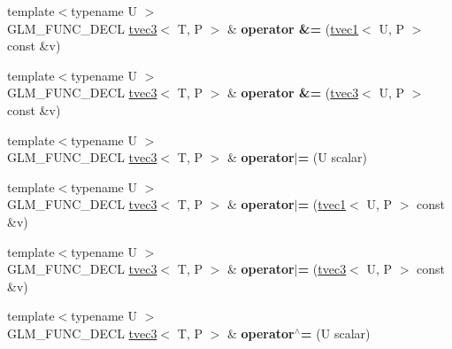 \begin{DoxyCompactItemize}
{\footnotesize template$<$typename U $>$ }\\G\+L\+M\+\_\+\+F\+U\+N\+C\+\_\+\+D\+E\+CL \hyperlink{structglm_1_1tvec3}{tvec3}$<$ T, P $>$ \& {\bfseries operator \&=} (\hyperlink{structglm_1_1tvec1}{tvec1}$<$ U, P $>$ const \&v)
\item 
\mbox{\label{structglm_1_1tvec3_a9a83c7ce91cb28c44ef9b4dfd66001c2}} 
{\footnotesize template$<$typename U $>$ }\\G\+L\+M\+\_\+\+F\+U\+N\+C\+\_\+\+D\+E\+CL \hyperlink{structglm_1_1tvec3}{tvec3}$<$ T, P $>$ \& {\bfseries operator \&=} (\hyperlink{structglm_1_1tvec3}{tvec3}$<$ U, P $>$ const \&v)
\item 
\mbox{\label{structglm_1_1tvec3_af7ccac158b76afbc783f3f107396c319}} 
{\footnotesize template$<$typename U $>$ }\\G\+L\+M\+\_\+\+F\+U\+N\+C\+\_\+\+D\+E\+CL \hyperlink{structglm_1_1tvec3}{tvec3}$<$ T, P $>$ \& {\bfseries operator$\vert$=} (U scalar)
\item 
\mbox{\label{structglm_1_1tvec3_a2fe619296352d6a5298b63b3d118bbeb}} 
{\footnotesize template$<$typename U $>$ }\\G\+L\+M\+\_\+\+F\+U\+N\+C\+\_\+\+D\+E\+CL \hyperlink{structglm_1_1tvec3}{tvec3}$<$ T, P $>$ \& {\bfseries operator$\vert$=} (\hyperlink{structglm_1_1tvec1}{tvec1}$<$ U, P $>$ const \&v)
\item 
\mbox{\label{structglm_1_1tvec3_a81a873ab5ca19d6bf3360a11f65d4f50}} 
{\footnotesize template$<$typename U $>$ }\\G\+L\+M\+\_\+\+F\+U\+N\+C\+\_\+\+D\+E\+CL \hyperlink{structglm_1_1tvec3}{tvec3}$<$ T, P $>$ \& {\bfseries operator$\vert$=} (\hyperlink{structglm_1_1tvec3}{tvec3}$<$ U, P $>$ const \&v)
\item 
\mbox{\label{structglm_1_1tvec3_a33635853bb12dc0ff6e828a805a20141}} 
{\footnotesize template$<$typename U $>$ }\\G\+L\+M\+\_\+\+F\+U\+N\+C\+\_\+\+D\+E\+CL \hyperlink{structglm_1_1tvec3}{tvec3}$<$ T, P $>$ \& {\bfseries operator$^\wedge$=} (U scalar)
\item 
\mbox{\label{structglm_1_1tvec3_a5dd85e96e456dee71a1e62bfed87aaf5}} 

\end{DoxyCompactItemize}
